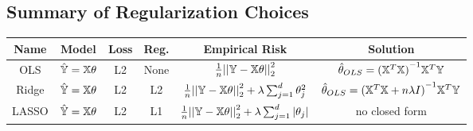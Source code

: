 \subsection{Summary of Regularization Choices}
\begin{center}
    \begin{tabular}{c|ccc|c|c}
        Name & Model & Loss & Reg. & Empirical Risk & Solution \\
        \hline
        OLS & $\hat{\mathbb{Y}} = \mathbb{X} \theta$ & L2 & None & $\frac{1}{n}{||\mathbb{Y} - \mathbb{X} \theta||}_2^2$ & $\hat{\theta}_{OLS} = {(\mathbb{X}^T \mathbb{X})}^{-1} \mathbb{X}^T \mathbb{Y}$ \\
        Ridge & $\hat{\mathbb{Y}} = \mathbb{X} \theta$ & L2 & L2 & $\frac{1}{n}{||\mathbb{Y} - \mathbb{X} \theta||}_2^2 + \lambda \sum_{j = 1}^d \theta_j^2$ & $\hat{\theta}_{OLS} = {(\mathbb{X}^T \mathbb{X} + n\lambda I)}^{-1} \mathbb{X}^T \mathbb{Y}$ \\
        LASSO & $\hat{\mathbb{Y}} = \mathbb{X} \theta$ & L2 & L1 & $\frac{1}{n}{||\mathbb{Y} - \mathbb{X} \theta||}_2^2 + \lambda \sum_{j = 1}^d |\theta_j|$ & no closed form
    \end{tabular}
\end{center}
